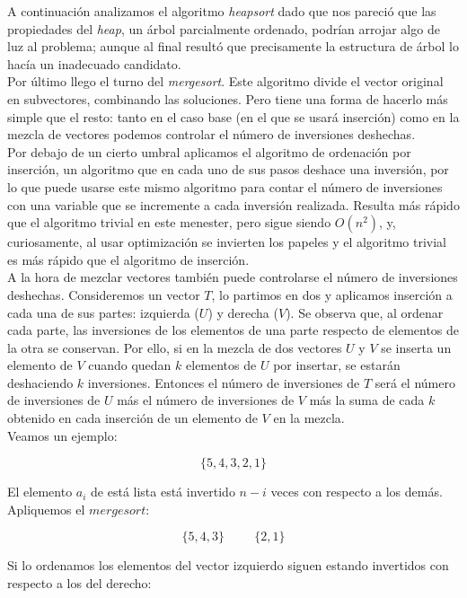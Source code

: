A continuación analizamos el algoritmo \textit{heapsort} dado que nos pareció que las propiedades del \textit{heap}, un árbol parcialmente ordenado, podrían arrojar algo de luz al problema; aunque al final resultó que precisamente la estructura de árbol lo hacía un inadecuado candidato. \\

Por último llego el turno del \textit{mergesort}. Este algoritmo divide el vector original en subvectores, combinando las soluciones. Pero tiene una forma de hacerlo más simple que el resto: tanto en el caso base (en el que se usará inserción) como en la mezcla de vectores podemos controlar el número de inversiones deshechas. \\

Por debajo de un cierto umbral aplicamos el algoritmo de ordenación por inserción, un algoritmo que en cada uno de sus pasos deshace una inversión, por lo que puede usarse este mismo algoritmo para contar el número de inversiones con una variable que se incremente a cada inversión realizada. Resulta más rápido que el algoritmo trivial en este menester, pero sigue siendo $O(n^2)$, y, curiosamente, al usar optimización se invierten los papeles y el algoritmo trivial es más rápido que el algoritmo de inserción. \\

A la hora de mezclar vectores también puede controlarse el número de inversiones deshechas. Consideremos un vector $T$, lo partimos en dos y aplicamos inserción a cada una de sus partes: izquierda ($U$) y derecha ($V$). Se observa que, al ordenar cada parte, las inversiones de los elementos de una parte respecto de elementos de la otra se conservan. Por ello, si en la mezcla de dos vectores $U$ y $V$ se inserta un elemento de $V$ cuando quedan $k$ elementos de $U$ por insertar, se estarán deshaciendo $k$ inversiones. Entonces el número de inversiones de $T$ será el número de inversiones de $U$ más el número de inversiones de $V$ más la suma de cada $k$ obtenido en cada inserción de un elemento de $V$ en la mezcla.\\

Veamos un ejemplo:

$$ \{5,4,3,2,1\}$$

El elemento $a_i$ de está lista está invertido $n-i$ veces con respecto a los demás. Apliquemos el $mergesort$:

$$ \{5,4,3\} \hspace{1cm} \{2,1\}$$

Si lo ordenamos los elementos del vector izquierdo siguen estando invertidos con respecto a los del derecho:

